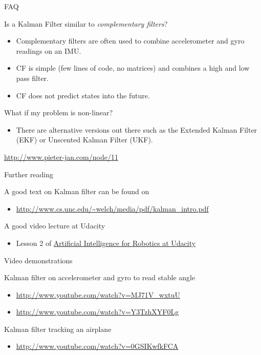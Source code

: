 \documentclass[compress]{beamer}
\begin{document}
\begin{frame}{FAQ}

Is a Kalman Filter similar to \emph{complementary filters}?

\begin{itemize}
    \item Complementary filters are often used to combine accelerometer and gyro
  readings on an IMU.
    \item CF is simple (few lines of code, no matrices) and combines a high and
  low pass filter.
    \item CF does not predict states into the future.
\end{itemize}

What if my problem is non-linear?

\begin{itemize}
    \item There are alternative versions out there such as the Extended Kalman
  Filter (EKF) or Unscented Kalman Filter (UKF).
\end{itemize}

\url{http://www.pieter-jan.com/node/11}

\end{frame}

\begin{frame}{Further reading}

A good text on Kalman filter can be found on

\begin{itemize}
    \item \url{http://www.cs.unc.edu/~welch/media/pdf/kalman_intro.pdf}
\end{itemize}

A good video lecture at Udacity

\begin{itemize}
    \item Lesson 2 of \href{https://www.udacity.com/course/cs373}{Artificial
  Intelligence for Robotics at Udacity}
\end{itemize}

Video demonstrations

Kalman filter on accelerometer and gyro to read stable angle

\begin{itemize}
    \item \url{http://www.youtube.com/watch?v=MJ71V_wxtuU}
    \item \url{http://www.youtube.com/watch?v=Y3TzhXYF0Lg}
\end{itemize}

Kalman filter tracking an airplane

\begin{itemize}
    \item \url{http://www.youtube.com/watch?v=0GSIKwfkFCA}
\end{itemize}

\end{frame}
\end{document}
